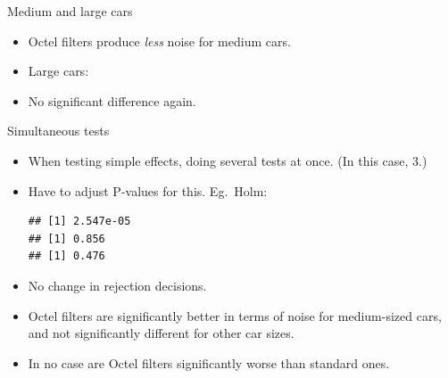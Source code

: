 \begin{frame}[fragile]{Medium and large cars}
  
  \begin{itemize}
\item Octel filters produce \emph{less} noise for medium cars.
\item Large cars:
\begin{knitrout}
\color{fgcolor}
\end{knitrout}

\item No significant difference again.

  \end{itemize}


\end{frame}

\begin{frame}[fragile]{Simultaneous tests}
  
  \begin{itemize}
  \item When testing simple effects, doing several tests at once. (In
    this case, 3.)
  \item Have to adjust P-values for this. Eg.\ Holm:
\begin{knitrout}
\color{fgcolor}\begin{kframe}
\begin{alltt}
\hlkwb{=}\hlstd{(}\hlstd{,}\hlstd{,}\hlstd{)}
\hlstd{p.values[}\hlstd{]}\hlopt{*} \hlstd{; p.values[}\hlstd{]}\hlopt{*} \hlstd{; p.values[}\hlstd{]}\hlopt{*}
\end{alltt}
\begin{verbatim}
## [1] 2.547e-05
## [1] 0.856
## [1] 0.476
\end{verbatim}
\end{kframe}
\end{knitrout}
\item No change in rejection decisions.
\item Octel filters are significantly better in terms of noise for
  medium-sized cars, and not significantly different for other car
  sizes.
\item In no case are Octel filters significantly worse than standard
  ones. 
  \end{itemize}
  
\end{frame}


